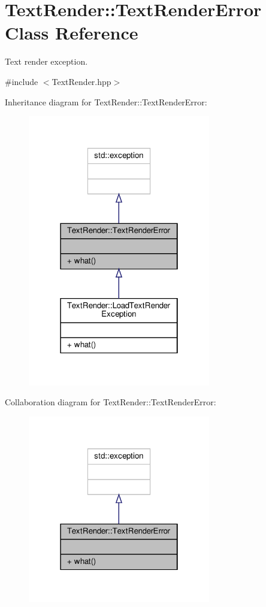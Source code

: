 \hypertarget{class_text_render_1_1_text_render_error}{}\section{Text\+Render\+:\+:Text\+Render\+Error Class Reference}
\label{class_text_render_1_1_text_render_error}


Text render exception.  




{\ttfamily \#include $<$Text\+Render.\+hpp$>$}



Inheritance diagram for Text\+Render\+:\+:Text\+Render\+Error\+:
\nopagebreak
\begin{figure}[H]
\begin{center}
\leavevmode
\includegraphics[width=226pt]{class_text_render_1_1_text_render_error__inherit__graph}
\end{center}
\end{figure}


Collaboration diagram for Text\+Render\+:\+:Text\+Render\+Error\+:
\nopagebreak
\begin{figure}[H]
\begin{center}
\leavevmode
\includegraphics[width=226pt]{class_text_render_1_1_text_render_error__coll__graph}
\end{center}
\end{figure}
